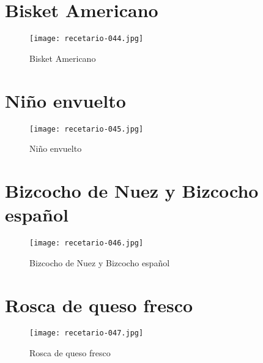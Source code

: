 \documentclass[12pt,letterpaper]{article}
\begin{document}
\newpage

\section{Bisket Americano}

  \begin{figure}[H]
    \vspace{2pt}
  \texttt{[image: recetario-044.jpg]}
    \caption{Bisket Americano}
    
  \end{figure}

\newpage

\section{Niño envuelto}

  \begin{figure}[H]
    \vspace{2pt}
  \texttt{[image: recetario-045.jpg]}
    \caption{Niño envuelto}
    
  \end{figure}

\newpage

\section{Bizcocho de Nuez y Bizcocho español}

  \begin{figure}[H]
    \vspace{2pt}
  \texttt{[image: recetario-046.jpg]}
    \caption{Bizcocho de Nuez y Bizcocho español}
    
  \end{figure}

\newpage

\section{Rosca de queso fresco}

  \begin{figure}[H]
    \vspace{2pt}
  \texttt{[image: recetario-047.jpg]}
    \caption{Rosca de queso fresco}
    
  \end{figure}
\end{document}
